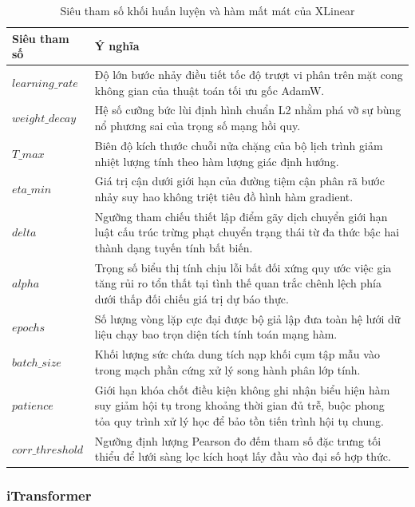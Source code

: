 \begin{table}[htbp]
\centering
\caption{Siêu tham số khối huấn luyện và hàm mất mát của XLinear}
\label{tab:xlinear_optim}
\renewcommand{\arraystretch}{1.3}
\begin{tabular}{p{3.8cm} p{10.5cm}}
\toprule
\textbf{Siêu tham số} & \textbf{Ý nghĩa} \\
\midrule
$learning\_rate$ & Độ lớn bước nhảy điều tiết tốc độ trượt vi phân trên mặt cong không gian của thuật toán tối ưu gốc AdamW. \\
$weight\_decay$ & Hệ số cưỡng bức lùi định hình chuẩn L2 nhằm phá vỡ sự bùng nổ phương sai của trọng số mạng hồi quy. \\
$T\_max$ & Biên độ kích thước chuỗi nửa chặng của bộ lịch trình giảm nhiệt lượng tính theo hàm lượng giác định hướng. \\
$eta\_min$ & Giá trị cận dưới giới hạn của đường tiệm cận phân rã bước nhảy suy hao không triệt tiêu đồ hình hàm gradient. \\
$delta$ & Ngưỡng tham chiếu thiết lập điểm gãy dịch chuyển giới hạn luật cấu trúc trừng phạt chuyển trạng thái từ đa thức bậc hai thành dạng tuyến tính bất biến. \\
$alpha$ & Trọng số biểu thị tính chịu lỗi bất đối xứng quy ước việc gia tăng rủi ro tổn thất tại tình thế quan trắc chênh lệch phía dưới thấp đối chiếu giá trị dự báo thực. \\
$epochs$ & Số lượng vòng lặp cực đại được bộ giả lập đưa toàn hệ lưới dữ liệu chạy bao trọn diện tích tính toán mạng hàm. \\
$batch\_size$ & Khối lượng sức chứa dung tích nạp khối cụm tập mẫu vào trong mạch phần cứng xử lý song hành phân lớp tính. \\
$patience$ & Giới hạn khóa chốt điều kiện không ghi nhận biểu hiện hàm suy giảm hội tụ trong khoảng thời gian đủ trễ, buộc phong tỏa quy trình xử lý học để bảo tồn tiến trình hội tụ chung. \\
$corr\_threshold$ & Ngưỡng định lượng Pearson đo đếm tham số đặc trưng tối thiểu để lưới sàng lọc kích hoạt lấy đầu vào đại số hợp thức. \\
\bottomrule
\end{tabular}
\end{table}



\subsubsection{iTransformer}

